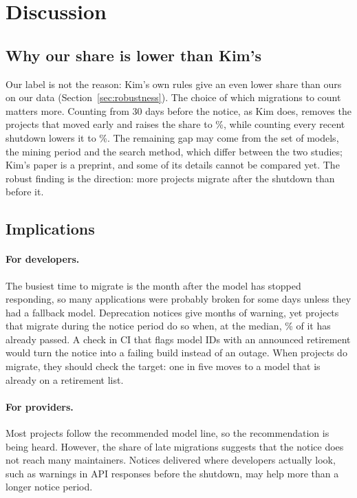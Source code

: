 \section{Discussion}\label{sec:discussion}

\subsection{Why our share is lower than Kim's}

Our label is not the reason: Kim's own rules give an even lower share than ours on our data (Section~\ref{sec:robustness}). The choice of which migrations to count matters more. Counting from 30 days before the notice, as Kim does, removes the projects that moved early and raises the share to \AfterWindow\%, while counting every recent shutdown lowers it to \AfterAll\%. The remaining gap may come from the set of models, the mining period and the search method, which differ between the two studies; Kim's paper is a preprint, and some of its details cannot be compared yet. The robust finding is the direction: more projects migrate after the shutdown than before it.

\subsection{Implications}

\paragraph{For developers.} The busiest time to migrate is the month after the model has stopped responding, so many applications were probably broken for some days unless they had a fallback model. Deprecation notices give months of warning, yet projects that migrate during the notice period do so when, at the median, \ExactNoticeUsed\% of it has already passed. A check in CI that flags model IDs with an announced retirement would turn the notice into a failing build instead of an outage. When projects do migrate, they should check the target: one in five moves to a model that is already on a retirement list.

\paragraph{For providers.} Most projects follow the recommended model line, so the recommendation is being heard. However, the share of late migrations suggests that the notice does not reach many maintainers. Notices delivered where developers actually look, such as warnings in API responses before the shutdown, may help more than a longer notice period.


